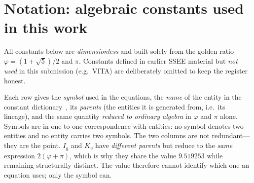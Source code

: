 \documentclass[a4paper,11pt]{article}
\begin{document}
\begin{abstract}
amplitude the shear asks for sits $0.49\sigma$ from the one the CMB fixes under
the same background, so fixing it leaves \emph{no} free cosmological parameter
and still predicts $S_8=0.8273$ against $0.8265\pm0.0176$ measured. The $\varphi$-dark-matter
extension that was formerly kept outside the core register is retracted. Both core forward predictions bear on
\emph{unreleased} data: the $(w_0,w_a)$ point is pre-registered to be excluded at
$>3\sigma$ if DESI~DR3 shifts it, and $r=\varphi^{-10}=8.130619\times10^{-3}$ is
testable by LiteBIRD---either alone can refute the framework without touching
the extension sector. The result is a falsifiable,
parameter-frugal description of dark energy whose core predictions rest on
$\varphi$ and $\pi$ alone.
\end{abstract}

\clearpage
{\small\tableofcontents}
\clearpage

\section*{Notation: algebraic constants used in this work}
\label{sec:notation}

All constants below are \emph{dimensionless} and built solely from the golden
ratio $\varphi=(1+\sqrt5)/2$ and $\pi$. Constants defined in earlier SSEE
material but \emph{not used} in this submission (e.g.\ VITA) are deliberately
omitted to keep the register honest.

Each row gives the \emph{symbol} used in the equations, the \emph{name} of the
entity in the constant dictionary~\citep{AlmeidaSSEE2026genesis}, its
\emph{parents} (the entities it is generated from, i.e.\ its lineage), and the
same quantity \emph{reduced to ordinary algebra} in $\varphi$ and $\pi$ alone.
Symbols are in one-to-one correspondence with entities: no symbol denotes two
entities and no entity carries two symbols. The two columns are not redundant---
they are the point. $I_g$ and $K_v$ have \emph{different parents} but reduce to
the \emph{same} expression $2(\varphi+\pi)$, which is why they share the value
$9.519253$ while remaining structurally distinct. The value therefore cannot
identify which one an equation uses; only the symbol can.
\end{document}
